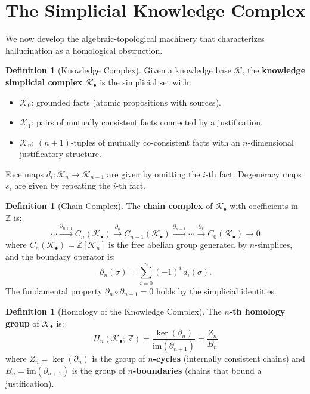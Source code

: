 \documentclass[11pt,a4paper,twocolumn]{article}
\theoremstyle{plain}
\theoremstyle{definition}
\newtheorem{definition}[theorem]{Definition}
\newcommand{\im}{\mathrm{im}}
\begin{document}
\section{The Simplicial Knowledge Complex}\label{sec:simplicial}

We now develop the algebraic-topological machinery that characterizes hallucination as a homological obstruction.

\begin{definition}[Knowledge Complex]\label{def:knowledge-complex}
Given a knowledge base $\mathcal{K}$, the \textbf{knowledge simplicial complex} $\mathcal{K}_\bullet$ is the simplicial set with:
\begin{itemize}[nosep]
  \item $\mathcal{K}_0$: grounded facts (atomic propositions with sources).
  \item $\mathcal{K}_1$: pairs of mutually consistent facts connected by a justification.
  \item $\mathcal{K}_n$: $(n+1)$-tuples of mutually co-consistent facts with an $n$-dimensional justificatory structure.
\end{itemize}
Face maps $d_i\colon \mathcal{K}_n \to \mathcal{K}_{n-1}$ are given by omitting the $i$-th fact. Degeneracy maps $s_i$ are given by repeating the $i$-th fact.
\end{definition}

\begin{definition}[Chain Complex]\label{def:chain}
The \textbf{chain complex} of $\mathcal{K}_\bullet$ with coefficients in $\mathbb{Z}$ is:
\[
  \cdots \xrightarrow{\partial_{n+1}} C_n(\mathcal{K}_\bullet) \xrightarrow{\partial_n} C_{n-1}(\mathcal{K}_\bullet) \xrightarrow{\partial_{n-1}} \cdots \xrightarrow{\partial_1} C_0(\mathcal{K}_\bullet) \to 0
\]
where $C_n(\mathcal{K}_\bullet) = \mathbb{Z}[\mathcal{K}_n]$ is the free abelian group generated by $n$-simplices, and the boundary operator is:
\[
  \partial_n(\sigma) = \sum_{i=0}^{n} (-1)^i\, d_i(\sigma).
\]
The fundamental property $\partial_n \circ \partial_{n+1} = 0$ holds by the simplicial identities.
\end{definition}

\begin{definition}[Homology of the Knowledge Complex]\label{def:homology}
The \textbf{$n$-th homology group} of $\mathcal{K}_\bullet$ is:
\[
  H_n(\mathcal{K}_\bullet;\, \mathbb{Z}) = \frac{\ker(\partial_n)}{\im(\partial_{n+1})} = \frac{Z_n}{B_n}
\]
where $Z_n = \ker(\partial_n)$ is the group of \textbf{$n$-cycles} (internally consistent chains) and $B_n = \im(\partial_{n+1})$ is the group of \textbf{$n$-boundaries} (chains that bound a justification).
\end{definition}
\end{document}
